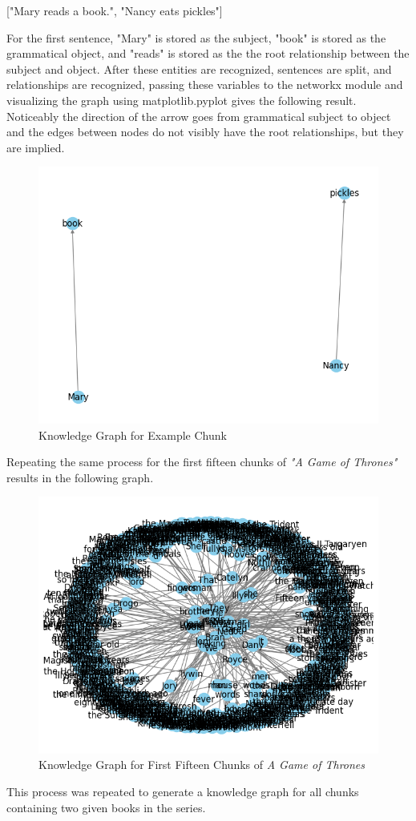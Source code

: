 \begin{center}
["Mary reads a book.", "Nancy eats pickles"]
\end{center}
\bigskip

For the first sentence, "Mary" is stored as the subject, "book" is stored as the grammatical object, and "reads" is stored as the the root relationship between the subject and object. After these entities are recognized, sentences are split, and relationships are recognized, passing these variables to the networkx module and visualizing the graph using matplotlib.pyplot gives the following result. Noticeably the direction of the arrow goes from grammatical subject to object and the edges between nodes do not visibly have the root relationships, but they are implied.

\begin{figure}[h]
    \centering
    \includegraphics[width=0.75\linewidth]{images/example_kg.png}
    \caption{Knowledge Graph for Example Chunk}
    \label{fig:enter-label}
\end{figure}

\newpage

Repeating the same process for the first fifteen chunks of \textit{"A Game of Thrones"} results in the following graph.

\begin{figure}[h]
    \centering
    \includegraphics[width=0.75\linewidth]{images/15_chunk_got_kg.png}
    \caption{Knowledge Graph for First Fifteen Chunks of \textit{A Game of Thrones}}
    \label{fig:enter-label}
\end{figure} \par

This process was repeated to generate a knowledge graph for all chunks containing two given books in the series.

\bigskip